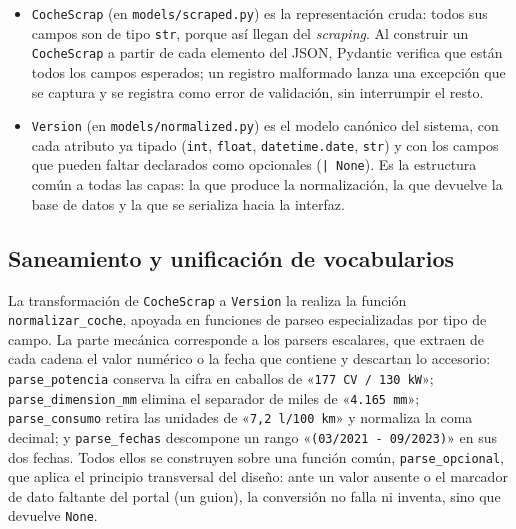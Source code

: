 \begin{itemize}
    \item \texttt{CocheScrap} (en \texttt{models/scraped.py}) es la
    representación cruda: todos sus campos son de tipo \texttt{str}, porque así
    llegan del \emph{scraping}. Al construir un \texttt{CocheScrap} a partir de
    cada elemento del JSON, Pydantic verifica que están todos los campos
    esperados; un registro malformado lanza una excepción que se captura y se
    registra como error de validación, sin interrumpir el resto.

    \item \texttt{Version} (en \texttt{models/normalized.py}) es el modelo
    canónico del sistema, con cada atributo ya tipado (\texttt{int},
    \texttt{float}, \texttt{datetime.date}, \texttt{str}) y con los campos que
    pueden faltar declarados como opcionales (\texttt{| None}). Es la estructura
    común a todas las capas: la que produce la normalización, la que devuelve la
    base de datos y la que se serializa hacia la interfaz.
\end{itemize}

\subsection{Saneamiento y unificación de vocabularios}
\label{sec:impl-etl-normalizacion}

La transformación de \texttt{CocheScrap} a \texttt{Version} la realiza la función
\texttt{normalizar\_coche}, apoyada en funciones de parseo especializadas por tipo
de campo. La parte mecánica corresponde a los parsers escalares, que extraen de
cada cadena el valor numérico o la fecha que contiene y descartan lo accesorio:
\texttt{parse\_potencia} conserva la cifra en caballos de «\texttt{177 CV / 130
kW}»; \texttt{parse\_dimension\_mm} elimina el separador de miles de «\texttt{4.165
mm}»; \texttt{parse\_consumo} retira las unidades de «\texttt{7,2 l/100 km}» y
normaliza la coma decimal; y \texttt{parse\_fechas} descompone un rango
«\texttt{(03/2021 - 09/2023)}» en sus dos fechas. Todos ellos se construyen sobre
una función común, \texttt{parse\_opcional}, que aplica el principio transversal
del diseño: ante un valor ausente o el marcador de dato faltante del portal (un
guion), la conversión no falla ni inventa, sino que devuelve \texttt{None}.

